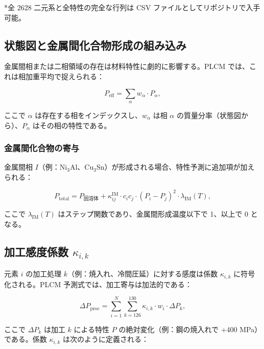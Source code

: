 \documentclass[11pt,a4paper]{article}
\theoremstyle{remark}
\begin{document}
	*全 2628 二元系と全特性の完全な行列は CSV ファイルとしてリポジトリで入手可能。
	
	\subsection{状態図と金属間化合物形成の組み込み}
	\label{subsec:phase-diagrams}
	
	金属間相または二相領域の存在は材料特性に劇的に影響する。PLCM では、これは相加重平均で捉えられる：
	
	\begin{equation}
		P_{\text{eff}} = \sum_{\alpha} w_{\alpha} \cdot P_{\alpha},
		\label{eq:phase-weighted}
	\end{equation}
	
	ここで \(\alpha\) は存在する相をインデックスし、\(w_{\alpha}\) は相 \(\alpha\) の質量分率（状態図から）、\(P_{\alpha}\) はその相の特性である。
	
	\subsubsection{金属間化合物の寄与}
	金属間相 \(I\)（例：Ni\(_3\)Al、Cu\(_3\)Sn）が形成される場合、特性予測に追加項が加えられる：
	
	\begin{equation}
		P_{\text{total}} = P_{\text{固溶体}} + \kappa_{ij}^{\text{IM}} \cdot c_i c_j \cdot (P_i - P_j)^2 \cdot \lambda_{\text{IM}}(T),
		\label{eq:intermetallic-term}
	\end{equation}
	
	ここで \(\lambda_{\text{IM}}(T)\) はステップ関数であり、金属間形成温度以下で 1、以上で 0 となる。
	
	\subsection{加工感度係数 \(\kappa_{i,k}\)}
	\label{subsec:processing-coefficients}
	
	元素 \(i\) の加工処理 \(k\)（例：焼入れ、冷間圧延）に対する感度は係数 \(\kappa_{i,k}\) に符号化される。PLCM 予測式では、加工寄与は加法的である：
	
	\begin{equation}
		\Delta P_{\text{proc}} = \sum_{i=1}^{N} \sum_{k=126}^{130} \kappa_{i,k} \cdot w_i \cdot \Delta P_k,
		\label{eq:proc-contribution}
	\end{equation}
	
	ここで \(\Delta P_k\) は加工 \(k\) による特性 \(P\) の絶対変化（例：鋼の焼入れで +400 MPa）である。係数 \(\kappa_{i,k}\) は次のように定義される：
	
\end{document}
